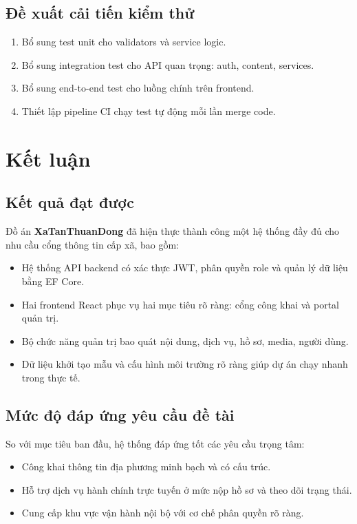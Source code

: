 \documentclass[12pt,a4paper]{article}
\begin{document}
\subsection{Đề xuất cải tiến kiểm thử}
\begin{enumerate}[leftmargin=1.1cm]
  \item Bổ sung test unit cho validators và service logic.
  \item Bổ sung integration test cho API quan trọng: auth, content, services.
  \item Bổ sung end-to-end test cho luồng chính trên frontend.
  \item Thiết lập pipeline CI chạy test tự động mỗi lần merge code.
\end{enumerate}

\newpage

\section{Kết luận}

\subsection{Kết quả đạt được}
Đồ án \textbf{XaTanThuanDong} đã hiện thực thành công một hệ thống đầy đủ cho nhu cầu cổng thông tin cấp xã, bao gồm:
\begin{itemize}[leftmargin=1.1cm]
  \item Hệ thống API backend có xác thực JWT, phân quyền role và quản lý dữ liệu bằng EF Core.
  \item Hai frontend React phục vụ hai mục tiêu rõ ràng: cổng công khai và portal quản trị.
  \item Bộ chức năng quản trị bao quát nội dung, dịch vụ, hồ sơ, media, người dùng.
  \item Dữ liệu khởi tạo mẫu và cấu hình môi trường rõ ràng giúp dự án chạy nhanh trong thực tế.
\end{itemize}

\subsection{Mức độ đáp ứng yêu cầu đề tài}
So với mục tiêu ban đầu, hệ thống đáp ứng tốt các yêu cầu trọng tâm:
\begin{itemize}[leftmargin=1.1cm]
  \item Công khai thông tin địa phương minh bạch và có cấu trúc.
  \item Hỗ trợ dịch vụ hành chính trực tuyến ở mức nộp hồ sơ và theo dõi trạng thái.
  \item Cung cấp khu vực vận hành nội bộ với cơ chế phân quyền rõ ràng.
\end{itemize}
\end{document}
